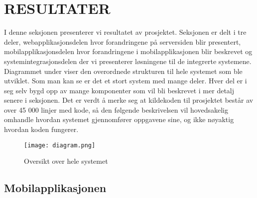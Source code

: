 \documentclass[../main.tex]{subfiles}
\begin{document}
\section{RESULTATER}

I denne seksjonen presenterer vi resultatet av prosjektet. Seksjonen er delt i tre deler, webapplikasjonsdelen hvor forandringene på serversiden blir presentert, mobilapplikasjonsdelen hvor forandringene i mobilapplikasjonen blir beskrevet og systemintegrasjonsdelen der vi presenterer løsningene til de integrerte systemene.\newline
\newline
Diagrammet under viser den overordnede strukturen til hele systemet som ble utviklet. Som man kan se er det et stort system med mange deler. Hver del er i seg selv bygd opp av mange komponenter som vil bli beskrevet i mer detalj senere i seksjonen. Det er verdt å merke seg at kildekoden til prosjektet består av over 45 000 linjer med kode, så den følgende beskrivelsen vil hovedsakelig omhandle hvordan systemet gjennomfører oppgavene sine, og ikke nøyaktig hvordan koden fungerer.

\begin{figure}[H]
  \centering
  \texttt{[image: diagram.png]}
  \caption{Oversikt over hele systemet}
\end{figure}

\subsection{Mobilapplikasjonen}
\end{document}
